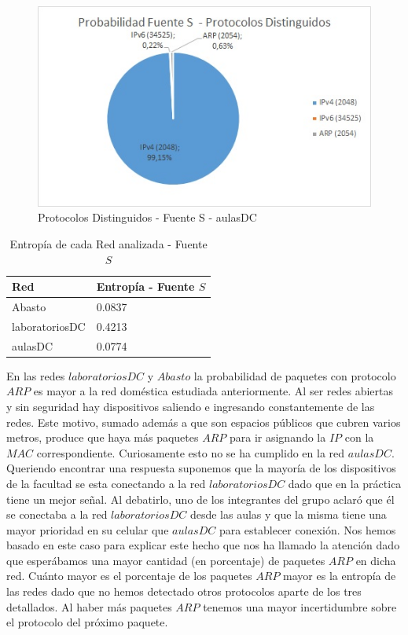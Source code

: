 \begin{figure}[h!]
\centering
\includegraphics[scale=0.7]{./img/probaS_aulasDC.jpg}
\caption{Protocolos Distinguidos - Fuente S - aulasDC}
\end{figure}

\begin{table}[htb]
\begin{center}
\begin{tabular}{|l|l|}
\hline
Red & Entropía - Fuente $S$  \\
\hline \hline
Abasto & 0.0837 \\ \hline
laboratoriosDC & 0.4213 \\ \hline
aulasDC & 0.0774  \\ \hline
\end{tabular}
\caption{Entropía de cada Red analizada - Fuente $S$}
\label{tabla informacion}
\end{center}
\end{table}

En las redes $laboratoriosDC$ y $Abasto$ la probabilidad de paquetes con protocolo $ARP$ es mayor a la red doméstica estudiada anteriormente. 
Al ser redes abiertas y sin seguridad hay dispositivos saliendo e ingresando constantemente de las redes. Este motivo, sumado además a que 
son espacios públicos que cubren varios metros, produce que haya más paquetes $ARP$ para ir asignando la $IP$ con la $MAC$ correspondiente.
Curiosamente esto no se ha cumplido en la red $aulasDC$. Queriendo encontrar una respuesta suponemos que la mayoría de los dispositivos de la facultad
se esta conectando a la red $laboratoriosDC$ dado que en la práctica tiene un mejor señal. Al debatirlo, uno de los integrantes del grupo aclaró que
él se conectaba a la red $laboratoriosDC$ desde las aulas y que la misma tiene una mayor prioridad en su celular que $aulasDC$ para establecer 
conexión. Nos hemos basado en este caso para explicar este hecho que nos ha llamado la atención dado que esperábamos una mayor cantidad 
(en porcentaje) de paquetes $ARP$ en dicha red. Cuánto mayor es el porcentaje de los paquetes $ARP$ mayor es la entropía de las redes dado que 
no hemos detectado otros protocolos aparte de los tres detallados. Al haber más paquetes $ARP$ tenemos una mayor incertidumbre sobre el protocolo
del próximo paquete.\\

